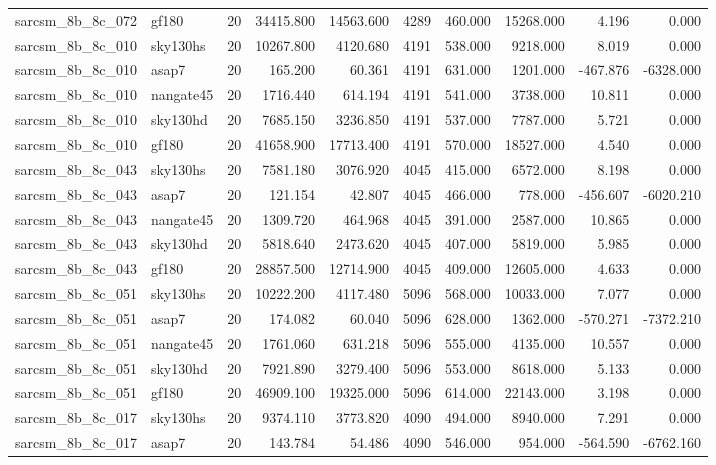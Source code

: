 \documentclass{article}
\begin{document}
\begin{longtable}{llrrrrrrrr}
sarcsm\_8b\_8c\_072 & gf180 & 20 & 34415.800 & 14563.600 & 4289 & 460.000 & 15268.000 & 4.196 & 0.000 \\
sarcsm\_8b\_8c\_010 & sky130hs & 20 & 10267.800 & 4120.680 & 4191 & 538.000 & 9218.000 & 8.019 & 0.000 \\
sarcsm\_8b\_8c\_010 & asap7 & 20 & 165.200 & 60.361 & 4191 & 631.000 & 1201.000 & -467.876 & -6328.000 \\
sarcsm\_8b\_8c\_010 & nangate45 & 20 & 1716.440 & 614.194 & 4191 & 541.000 & 3738.000 & 10.811 & 0.000 \\
sarcsm\_8b\_8c\_010 & sky130hd & 20 & 7685.150 & 3236.850 & 4191 & 537.000 & 7787.000 & 5.721 & 0.000 \\
sarcsm\_8b\_8c\_010 & gf180 & 20 & 41658.900 & 17713.400 & 4191 & 570.000 & 18527.000 & 4.540 & 0.000 \\
sarcsm\_8b\_8c\_043 & sky130hs & 20 & 7581.180 & 3076.920 & 4045 & 415.000 & 6572.000 & 8.198 & 0.000 \\
sarcsm\_8b\_8c\_043 & asap7 & 20 & 121.154 & 42.807 & 4045 & 466.000 & 778.000 & -456.607 & -6020.210 \\
sarcsm\_8b\_8c\_043 & nangate45 & 20 & 1309.720 & 464.968 & 4045 & 391.000 & 2587.000 & 10.865 & 0.000 \\
sarcsm\_8b\_8c\_043 & sky130hd & 20 & 5818.640 & 2473.620 & 4045 & 407.000 & 5819.000 & 5.985 & 0.000 \\
sarcsm\_8b\_8c\_043 & gf180 & 20 & 28857.500 & 12714.900 & 4045 & 409.000 & 12605.000 & 4.633 & 0.000 \\
sarcsm\_8b\_8c\_051 & sky130hs & 20 & 10222.200 & 4117.480 & 5096 & 568.000 & 10033.000 & 7.077 & 0.000 \\
sarcsm\_8b\_8c\_051 & asap7 & 20 & 174.082 & 60.040 & 5096 & 628.000 & 1362.000 & -570.271 & -7372.210 \\
sarcsm\_8b\_8c\_051 & nangate45 & 20 & 1761.060 & 631.218 & 5096 & 555.000 & 4135.000 & 10.557 & 0.000 \\
sarcsm\_8b\_8c\_051 & sky130hd & 20 & 7921.890 & 3279.400 & 5096 & 553.000 & 8618.000 & 5.133 & 0.000 \\
sarcsm\_8b\_8c\_051 & gf180 & 20 & 46909.100 & 19325.000 & 5096 & 614.000 & 22143.000 & 3.198 & 0.000 \\
sarcsm\_8b\_8c\_017 & sky130hs & 20 & 9374.110 & 3773.820 & 4090 & 494.000 & 8940.000 & 7.291 & 0.000 \\
sarcsm\_8b\_8c\_017 & asap7 & 20 & 143.784 & 54.486 & 4090 & 546.000 & 954.000 & -564.590 & -6762.160 \\

\end{longtable}
\end{document}
